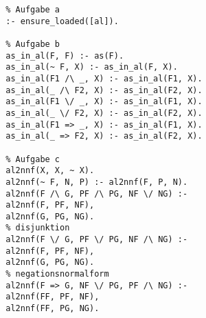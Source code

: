 \documentclass[a4paper,10pt]{article}
\begin{document}
		\begin{verbatim}
		% Aufgabe a
		:- ensure_loaded([al]).
		
		% Aufgabe b
		as_in_al(F, F) :- as(F).
		as_in_al(~ F, X) :- as_in_al(F, X).
		as_in_al(F1 /\ _, X) :- as_in_al(F1, X).
		as_in_al(_ /\ F2, X) :- as_in_al(F2, X).
		as_in_al(F1 \/ _, X) :- as_in_al(F1, X).
		as_in_al(_ \/ F2, X) :- as_in_al(F2, X).
		as_in_al(F1 => _, X) :- as_in_al(F1, X).
		as_in_al(_ => F2, X) :- as_in_al(F2, X).
		
		% Aufgabe c
		al2nnf(X, X, ~ X).
		al2nnf(~ F, N, P) :- al2nnf(F, P, N).
		al2nnf(F /\ G, PF /\ PG, NF \/ NG) :-
		al2nnf(F, PF, NF),
		al2nnf(G, PG, NG).
		% disjunktion
		al2nnf(F \/ G, PF \/ PG, NF /\ NG) :-
		al2nnf(F, PF, NF),
		al2nnf(G, PG, NG).
		% negationsnormalform
		al2nnf(F => G, NF \/ PG, PF /\ NG) :-
		al2nnf(FF, PF, NF),
		al2nnf(FF, PG, NG).
		\end{verbatim}
\end{document}
